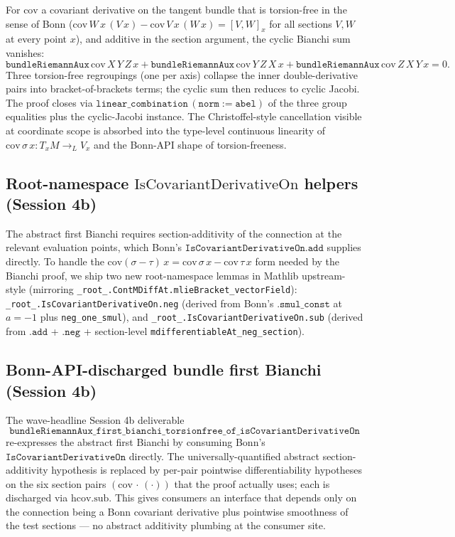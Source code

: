 \documentclass[twocolumn]{revtex4-2}
\begin{document}
For $\mathrm{cov}$ a covariant derivative on the tangent bundle that is
torsion-free in the sense of Bonn ($\mathrm{cov}\,W\,x\,(V\,x) -
\mathrm{cov}\,V\,x\,(W\,x) = [V, W]_x$ for all sections $V, W$ at every
point $x$), and additive in the section argument, the cyclic Bianchi
sum vanishes:
\begin{equation*}
\mathtt{bundleRiemannAux}\,\mathrm{cov}\,X\,Y\,Z\,x +
\mathtt{bundleRiemannAux}\,\mathrm{cov}\,Y\,Z\,X\,x +
\mathtt{bundleRiemannAux}\,\mathrm{cov}\,Z\,X\,Y\,x = 0.
\end{equation*}
Three torsion-free regroupings (one per axis) collapse the inner
double-derivative pairs into bracket-of-brackets terms; the cyclic
sum then reduces to cyclic Jacobi. The proof closes via
$\texttt{linear\_combination}\,(\texttt{norm} := \texttt{abel})$ of
the three group equalities plus the cyclic-Jacobi instance. The
Christoffel-style cancellation visible at coordinate scope is absorbed
into the type-level continuous linearity of $\mathrm{cov}\,\sigma\,x :
T_xM \to_L V_x$ and the Bonn-API shape of torsion-freeness.

\subsection{Root-namespace $\mathrm{IsCovariantDerivativeOn}$ helpers
(Session 4b)}

The abstract first Bianchi requires section-additivity of the
connection at the relevant evaluation points, which Bonn's
$\texttt{IsCovariantDerivativeOn.add}$ supplies directly. To handle
the $\mathrm{cov}(\sigma - \tau)\,x = \mathrm{cov}\,\sigma\,x -
\mathrm{cov}\,\tau\,x$ form needed by the Bianchi proof, we ship two
new root-namespace lemmas in Mathlib upstream-style (mirroring
\texttt{\_root\_.ContMDiffAt.mlieBracket\_vectorField}):
\texttt{\_root\_.IsCovariantDerivativeOn.neg} (derived from Bonn's
$\texttt{.smul\_const}$ at $a = -1$ plus \texttt{neg\_one\_smul}), and
\texttt{\_root\_.IsCovariantDerivativeOn.sub} (derived from
$\texttt{.add}$ + $\texttt{.neg}$ + section-level
\texttt{mdifferentiableAt\_neg\_section}).

\subsection{Bonn-API-discharged bundle first Bianchi (Session 4b)}

The wave-headline Session 4b deliverable
\begin{equation*}
\texttt{bundleRiemannAux\_first\_bianchi\_torsionfree\_of\_isCovariantDerivativeOn}
\end{equation*}
re-expresses the abstract first Bianchi by consuming Bonn's
$\texttt{IsCovariantDerivativeOn}$ directly. The
universally-quantified abstract section-additivity hypothesis is
replaced by per-pair pointwise differentiability hypotheses on the six
section pairs $(\mathrm{cov}\,\cdot\,(\cdot))$ that the proof actually
uses; each is discharged via $\mathrm{hcov.sub}$. This
gives consumers an interface that depends only on the connection
being a Bonn covariant derivative plus pointwise smoothness of the
test sections — no abstract additivity plumbing at the consumer site.
\end{document}
